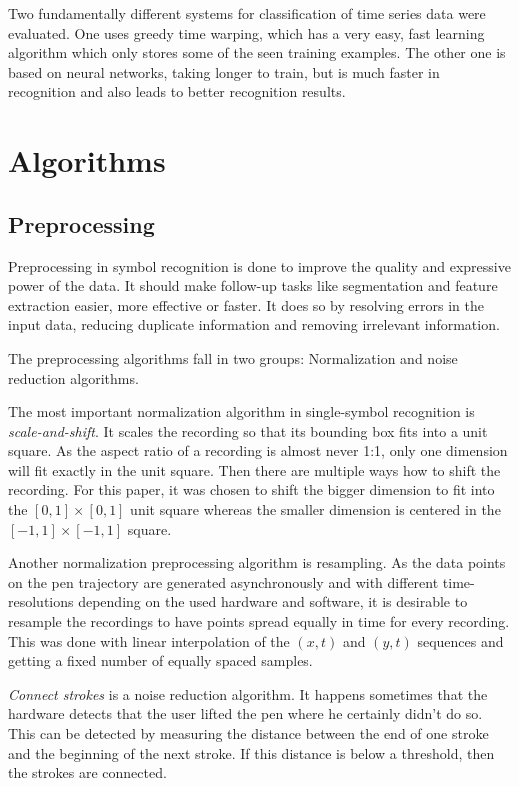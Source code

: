 \documentclass[9pt,technote]{IEEEtran}
\begin{document}
Two fundamentally different systems for classification of time series data were
evaluated. One uses greedy time warping, which has a very easy, fast learning
algorithm which only stores some of the seen training examples. The other one is
based on neural networks, taking longer to train, but is much faster in
recognition and also leads to better recognition results.

\section{Algorithms}
\subsection{Preprocessing}\label{sec:preprocessing}
Preprocessing in symbol recognition is done to improve the quality and
expressive power of the data. It should make follow-up tasks like segmentation
and feature extraction easier, more effective or faster. It does so by resolving
errors in the input data, reducing duplicate information and removing irrelevant
information.

The preprocessing algorithms fall in two groups: Normalization and noise
reduction algorithms.

The most important normalization algorithm in single-symbol recognition is
\textit{scale-and-shift}. It scales the recording so that
its bounding box fits into a unit square. As the aspect ratio of a recording
is almost never 1:1, only one dimension will fit exactly in the unit square.
Then there are multiple ways how to shift the recording. For this paper, it was
chosen to shift the bigger dimension to fit into the $[0,1] \times [0,1]$ unit
square whereas the smaller dimension is centered in the $[-1,1] \times [-1,1]$
square.

Another normalization preprocessing algorithm is resampling. As the data points
on the pen trajectory are generated asynchronously and with different
time-resolutions depending on the used hardware and software, it is desirable
to resample the recordings to have points spread equally in time for every
recording. This was done with linear interpolation of the $(x,t)$ and $(y,t)$
sequences and getting a fixed number of equally spaced samples.

\textit{Connect strokes} is a noise reduction algorithm. It happens sometimes
that the hardware detects that the user lifted the pen where he certainly
didn't do so. This can be detected by measuring the distance between the end of
one stroke and the beginning of the next stroke. If this distance is below a
threshold, then the strokes are connected.
\end{document}

